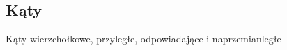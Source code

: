 \subsection{Kąty}
Kąty wierzchołkowe, przyległe, odpowiadające i naprzemianległe
\loremipsum











